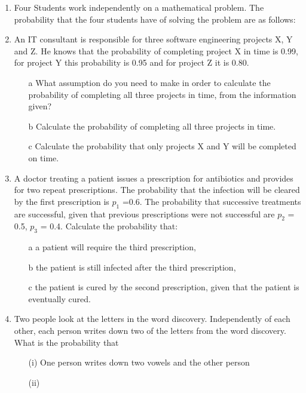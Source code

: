 \documentclass[12pt]{article}
\begin{document}
\begin{enumerate}
\item Four Students work independently on a mathematical problem. The probability that the four students have of solving the problem are as follows:
\item An IT consultant is responsible for three software engineering projects X, Y and Z.
He knows that the probability of completing project X in time is 0.99, for project Y this probability is 0.95
and for project Z it is 0.80.

\begin{itemize}
\item[a] What assumption do you need to make in order to calculate the probability
of completing all three projects in time, from the information given?
\item[b] Calculate the probability of completing all three projects in time.
\item[c] Calculate the probability that only projects X and Y will be completed on time.
\end{itemize}

\item A doctor treating a patient issues a prescription for antibiotics and provides for two repeat prescriptions. The probability that the infection will be cleared by the first prescription is $p_1$ =0.6.
The probability that successive treatments are successful, given that previous prescriptions were not successful are $p_2$ = 0.5, $p_3$ = 0.4. Calculate the probability that:

\begin{itemize}
\item[a] a patient will require the third prescription,
\item[b] the patient is still infected after the third prescription,
\item[c] the patient is cured by the second prescription, given that the patient is eventually cured.
\end{itemize}

\item Two people look at the letters in the word discovery. Independently of each other, each person writes down two of the letters from the word discovery.
What is the probability that
\begin{itemize}
\item[(i)] One person writes down two vowels and the other person 
\item[(ii)]
\end{itemize}


\end{enumerate}
\end{document}
